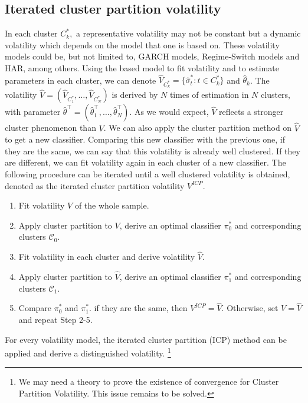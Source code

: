 \documentclass[preprint,12pt,authoryear]{elsarticle}
\begin{document}
 \subsection{Iterated cluster partition volatility}

In each cluster $C_k^{*},$ a representative volatility may not be constant but a dynamic volatility which depends on the model that one is based on. These volatility models could be, but not limited to, GARCH models, Regime-Switch models and HAR, among others.
 Using the based model to fit volatility and to estimate parameters in each cluster, we can denote $\hat{V}_{C_k^{*}}=\{\hat{\sigma}_t^{*}:t\in C_k^{*}\}$ and $\hat{\theta}_k$. The volatility $\hat{V}=(\hat{V}_{C_1^{*}},\dots,\hat{V}_{C_N^{*}})$ is derived by $N$ times of estimation in $N$ clusters, with parameter $\hat{\theta}^\top=(\hat{\theta}_1^\top,\dots,\hat{\theta}_N^\top)$.
 As we would expect, $\hat{V}$ reflects a stronger cluster phenomenon than $V$. We can also apply the cluster partition method on $\hat{V}$ to get a new classifier. Comparing this new classifier with the previous one, if they are the same, we can say that this volatility is already well clustered. If they are different, we can fit volatility again in each cluster of a new classifier. The following procedure can be iterated until a well clustered volatility is obtained, denoted as the iterated cluster partition volatility $V^{ICP}$.

 \begin{enumerate}[Step 1.]
     \item Fit volatility $V$ of the whole sample.
     \item Apply cluster partition to $V$, derive an optimal classifier $\pi^{*}_0$ and corresponding clusters $\mathcal{C}_0$.
     \item Fit volatility in each cluster and derive volatility $\hat{V}$.
     \item Apply cluster partition to $\hat{V}$, derive an optimal classifier $\pi^{*}_1$ and corresponding clusters $\mathcal{C}_1$.
     \item Compare $\pi^{*}_0$ and $\pi^{*}_1$. if they are the same, then $V^{ICP}=\hat{V}$. Otherwise,  set $V=\hat{V}$ and repeat Step 2-5.
 \end{enumerate}

 For every volatility model, the iterated cluster partition (ICP) method can be applied and derive a distinguished volatility.
 \footnote{We may need a theory to prove the existence of convergence for Cluster Partition Volatility. This issue remains to be solved.}
\end{document}
